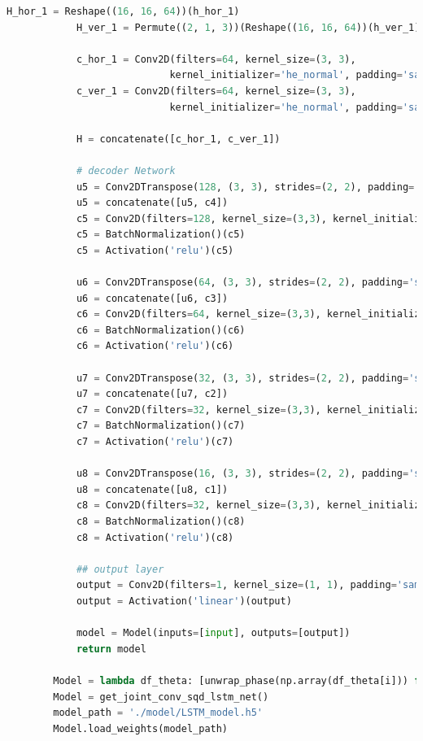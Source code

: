 \documentclass[a4paper]{article}
\begin{document}
\begin{lstlisting}[language=python,columns=fullflexible,frame=shadowbox]
			H_hor_1 = Reshape((16, 16, 64))(h_hor_1)
			H_ver_1 = Permute((2, 1, 3))(Reshape((16, 16, 64))(h_ver_1))
		
			c_hor_1 = Conv2D(filters=64, kernel_size=(3, 3),
							kernel_initializer='he_normal', padding='same')(H_hor_1)
			c_ver_1 = Conv2D(filters=64, kernel_size=(3, 3),
							kernel_initializer='he_normal', padding='same')(H_ver_1)
		
			H = concatenate([c_hor_1, c_ver_1])
		
			# decoder Network
			u5 = Conv2DTranspose(128, (3, 3), strides=(2, 2), padding='same')(H)
			u5 = concatenate([u5, c4])
			c5 = Conv2D(filters=128, kernel_size=(3,3), kernel_initializer='he_normal', padding='same')(u5)
			c5 = BatchNormalization()(c5)
			c5 = Activation('relu')(c5)
		
			u6 = Conv2DTranspose(64, (3, 3), strides=(2, 2), padding='same')(c5)
			u6 = concatenate([u6, c3])
			c6 = Conv2D(filters=64, kernel_size=(3,3), kernel_initializer='he_normal', padding='same')(u6)
			c6 = BatchNormalization()(c6)
			c6 = Activation('relu')(c6)
		
			u7 = Conv2DTranspose(32, (3, 3), strides=(2, 2), padding='same')(c6)
			u7 = concatenate([u7, c2])
			c7 = Conv2D(filters=32, kernel_size=(3,3), kernel_initializer='he_normal', padding='same')(u7)
			c7 = BatchNormalization()(c7)
			c7 = Activation('relu')(c7)
		
			u8 = Conv2DTranspose(16, (3, 3), strides=(2, 2), padding='same')(c7)
			u8 = concatenate([u8, c1])
			c8 = Conv2D(filters=32, kernel_size=(3,3), kernel_initializer='he_normal', padding='same')(u8)
			c8 = BatchNormalization()(c8)
			c8 = Activation('relu')(c8)
		
			## output layer
			output = Conv2D(filters=1, kernel_size=(1, 1), padding='same', name='out1')(c8)
			output = Activation('linear')(output)
		
			model = Model(inputs=[input], outputs=[output])
			return model

		Model = lambda df_theta: [unwrap_phase(np.array(df_theta[i])) for i in range(5)]
		Model = get_joint_conv_sqd_lstm_net()
		model_path = './model/LSTM_model.h5'
		Model.load_weights(model_path)
	\end{lstlisting}
\end{document}
